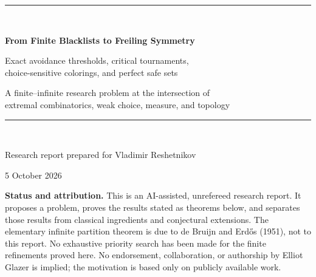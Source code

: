 \documentclass[11pt]{article}
\theoremstyle{definition}
\theoremstyle{remark}
\begin{document}
\hypersetup{pageanchor=false}
\begin{titlepage}
\centering
\vspace*{0.65in}
{\color{deepblue}\rule{0.88\textwidth}{1.4pt}}\\[0.35in]
{\Huge\bfseries From Finite Blacklists to Freiling Symmetry\par}
\vspace{0.15in}
{\LARGE Exact avoidance thresholds, critical tournaments,\\
choice-sensitive colorings, and perfect safe sets\par}
\vspace{0.33in}
{\large A finite--infinite research problem at the intersection of\\
extremal combinatorics, weak choice, measure, and topology\par}
\vspace{0.45in}
{\color{deepblue}\rule{0.88\textwidth}{1.4pt}}\\[0.55in]
{\Large Research report prepared for Vladimir Reshetnikov\par}
\vspace{0.12in}
{\large 5 October 2026\par}
\vfill
\begin{minipage}{0.88\textwidth}
\small
\noindent\textbf{Status and attribution.}
This is an AI-assisted, unrefereed research report.  It proposes a problem,
proves the results stated as theorems below, and separates those results from
classical ingredients and conjectural extensions.  The elementary infinite
partition theorem is due to de Bruijn and Erd\H{o}s (1951), not to this report.
No exhaustive priority search has been made for the finite refinements proved
here.  No endorsement, collaboration, or authorship by Elliot Glazer is
implied; the motivation is based only on publicly available work.
\end{minipage}
\end{titlepage}
\hypersetup{pageanchor=true}
\end{document}
